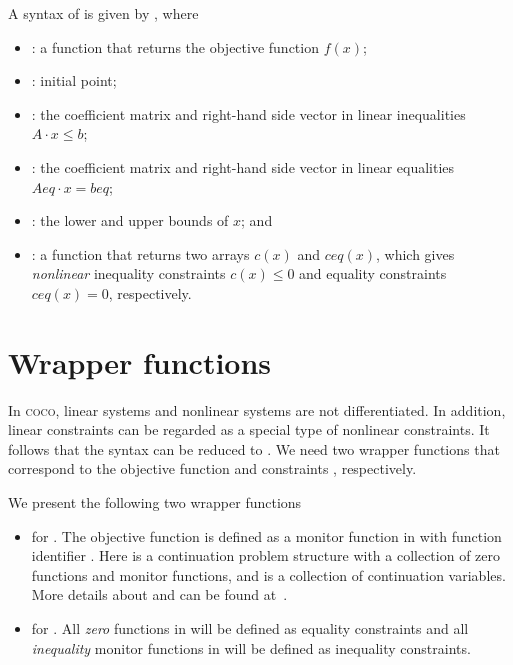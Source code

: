 A syntax of  is given by , where
\begin{itemize}
\item {}: a function that returns the objective function $f(x)$;
\item {}: initial point;
\item {}: the coefficient matrix and right-hand side vector in linear inequalities $A\cdot x\leq b$;
\item {}: the coefficient matrix and right-hand side vector in linear equalities $Aeq\cdot x= beq$;
\item {}: the lower and upper bounds of $x$; and
\item {}: a function that returns two arrays $c(x)$ and $ceq(x)$, which gives \emph{nonlinear} inequality constraints $c(x)\leq0$ and equality constraints $ceq(x)=0$, respectively.
\end{itemize}


\section{Wrapper functions}
\label{sec:wrapper}
In \textsc{coco}, linear systems and nonlinear systems are not differentiated. In addition, linear constraints can be regarded as a special type of nonlinear constraints. It follows that the syntax can be reduced to . We need two wrapper functions that correspond to the objective function  and constraints , respectively.

We present the following two wrapper functions
\begin{itemize}
\item {} for . The objective function is defined as a monitor function in  with function identifier . Here  is a continuation problem structure with a collection of zero functions and monitor functions, and  is a collection of continuation variables. More details about  and  can be found at~\cite{coco,coco-recipes}.
\item {} for . All \emph{zero} functions in  will be defined as equality constraints and all \emph{inequality} monitor functions in  will be defined as inequality constraints.
\end{itemize}

